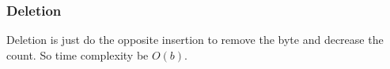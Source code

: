 \subsubsection{Deletion}

Deletion is just do the opposite insertion to remove the byte and decrease the count. So time complexity be $O(b)$.

